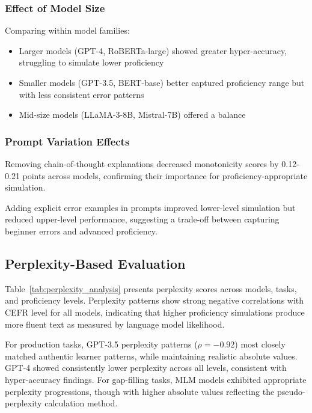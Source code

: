 \subsubsection{Effect of Model Size}

Comparing within model families:
\begin{itemize}
    \item Larger models (GPT-4, RoBERTa-large) showed greater hyper-accuracy, struggling to simulate lower proficiency
    \item Smaller models (GPT-3.5, BERT-base) better captured proficiency range but with less consistent error patterns
    \item Mid-size models (LLaMA-3-8B, Mistral-7B) offered a balance
\end{itemize}

\subsubsection{Prompt Variation Effects}

Removing chain-of-thought explanations decreased monotonicity scores by 0.12-0.21 points across models, confirming their importance for proficiency-appropriate simulation.

Adding explicit error examples in prompts improved lower-level simulation but reduced upper-level performance, suggesting a trade-off between capturing beginner errors and advanced proficiency.

\subsection{Perplexity-Based Evaluation}

Table~\ref{tab:perplexity_analysis} presents perplexity scores across models, tasks, and proficiency levels. Perplexity patterns show strong negative correlations with CEFR level for all models, indicating that higher proficiency simulations produce more fluent text as measured by language model likelihood.



For production tasks, GPT-3.5 perplexity patterns ($\rho = -0.92$) most closely matched authentic learner patterns, while maintaining realistic absolute values. GPT-4 showed consistently lower perplexity across all levels, consistent with hyper-accuracy findings. For gap-filling tasks, MLM models exhibited appropriate perplexity progressions, though with higher absolute values reflecting the pseudo-perplexity calculation method.

